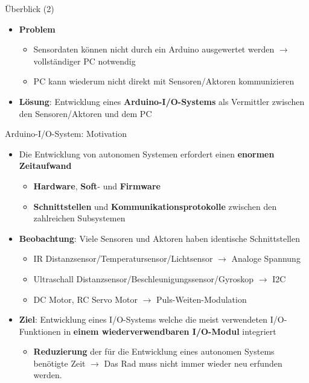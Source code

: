 \documentclass{beamer}
\begin{document}
\begin{frame}{\"Uberblick (2)}
\begin{itemize}
	\item \textbf{Problem}
	\begin{itemize}
		\item Sensordaten k\"onnen nicht durch ein Arduino ausgewertet werden $\rightarrow$ vollst\"andiger PC notwendig
		\item PC kann wiederum nicht direkt mit Sensoren/Aktoren kommunizieren
	\end{itemize}
\end{itemize}
\begin{itemize}
	\item \textbf{L\"osung}: Entwicklung eines \textbf{Arduino-I/O-Systems} als Vermittler zwischen den Sensoren/Aktoren und dem PC
\end{itemize}
\end{frame}
\begin{frame}{Arduino-I/O-System: Motivation}
	\begin{itemize}
		\item Die Entwicklung von autonomen Systemen erfordert einen \textbf{enormen Zeitaufwand}
		\begin{itemize}
			\item \textbf{Hardware}, \textbf{Soft}- und \textbf{Firmware}
			\item \textbf{Schnittstellen} und \textbf{Kommunikationsprotokolle} zwischen den zahlreichen Subsystemen
		\end{itemize}
	\end{itemize}
	\begin{itemize}
		\item \textbf{Beobachtung}: Viele Sensoren und Aktoren haben identische Schnittstellen
		\begin{itemize}
			\item IR Distanzsensor/Temperatursensor/Lichtsensor  $\rightarrow$ Analoge Spannung
			\item Ultraschall Distanzsensor/Beschleunigungssensor/Gyroskop $\rightarrow$ I2C
			\item DC Motor, RC Servo Motor $\rightarrow$ Puls-Weiten-Modulation
		\end{itemize}
	\end{itemize}
	\begin{itemize}
		\item \textbf{Ziel}: Entwicklung eines I/O-Systems welche die meist verwendeten I/O-Funktionen in \textbf{einem wiederverwendbaren I/O-Modul} integriert
		\begin{itemize}
			\item \textbf{Reduzierung} der f\"ur die Entwicklung eines autonomen Systems ben\"otigte Zeit $\rightarrow$ Das Rad muss nicht immer wieder neu erfunden werden.
		\end{itemize}
	\end{itemize}
\end{frame}
\end{document}
